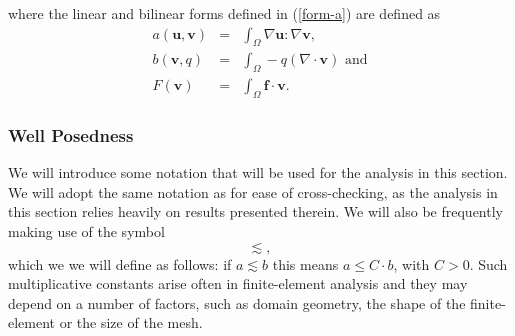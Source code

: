 \documentclass[12pt,a4paper]{article}
\theoremstyle{definition}
\begin{document}
where the linear and bilinear forms defined in (\ref{form-a}) are defined as 
\begin{eqnarray}\label{weak-a}
	a\left(\textbf{u},\textbf{v}\right)&=&\int_{\Omega}\nabla \textbf{u} : \nabla \textbf{v}, \\\label{weak-b}
	b\left(\textbf{v},q\right) &=& \int_{\Omega}-q\left(\nabla \cdot \textbf{v}\right) \text{ and}\\\label{weak-F}
    F\left(\textbf{v}\right) &=& \int_{\Omega}\textbf{f}\cdot \textbf{v} .
\end{eqnarray}

\subsubsection{Well Posedness}\label{sec_wellposed}
We will introduce some notation that will be used for the analysis in this section.  We will adopt the same notation as \cite{Chen2016} for ease of cross-checking, as the analysis in this section relies heavily on results presented therein. 
We will also be frequently making use of the symbol
\begin{equation}
	\lesssim \nonumber,
\end{equation}
which we we will define as follows: if $a\lesssim b$ this means $a\leq C\cdot b$, with $C>0$.  Such multiplicative constants arise often in finite-element analysis and they may depend on a number of factors, such as domain geometry, the shape of the finite-element or the size of the mesh.  
\end{document}

